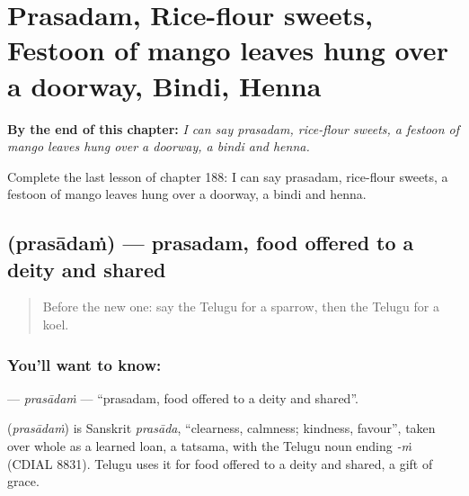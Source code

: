 
\chapter{Prasadam, Rice-flour sweets, Festoon of mango leaves hung over a doorway, Bindi, Henna}
\label{ch:te-prasadam-rice-flour-sweets-festoon-of-mango-leaves-hung-over-a-doorway-bindi-henna}

\begin{chapteropening}
\textbf{By the end of this chapter:} \emph{I can say prasadam, rice-flour sweets, a festoon of mango leaves hung over a doorway, a bindi and henna.}

Complete the last lesson of chapter 188: I can say prasadam, rice-flour sweets, a festoon of mango leaves hung over a doorway, a bindi and henna.
\end{chapteropening}

\section[\texorpdfstring{\te{ప్రసాదం} (prasādaṁ)}{ప్రసాదం (prasādaṁ)}]{ (prasādaṁ) — prasadam, food offered to a deity and shared}

\label{lesson:TE-C188-prasadam}



\begin{quote}
Before the new one: say the Telugu for a sparrow, then the Telugu for a koel.
\end{quote}

\subsection*{You'll want to know: }
\textbf{} — \emph{prasādaṁ} — \textquotedblleft{}prasadam, food offered to a deity and shared\textquotedblright{}.

\begin{cousinweb}
\textbf{} (\emph{prasādaṁ}) is Sanskrit \emph{prasāda}, \textquotedblleft{}clearness, calmness; kindness, favour\textquotedblright{}, taken over whole as a learned loan, a tatsama, with the Telugu noun ending \emph{-ṁ} (CDIAL 8831). Telugu uses it for food offered to a deity and shared, a gift of grace.
\end{cousinweb}

